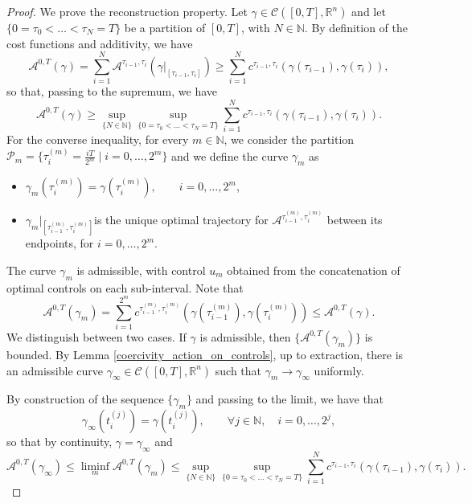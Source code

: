\documentclass[reqno]{amsart}
\theoremstyle{plain}
\theoremstyle{definition}
\theoremstyle{remark}
\newcommand{\R}{\mathbb{R}}
\begin{document}
\begin{proof}
		We prove the reconstruction property. Let $\gamma\in\mathcal{C}([0,T],\mathbb{R}^n)$ and let $\{0=\tau_0<\ldots<\tau_N=T\}$ be a partition of $[0,T]$, with $N\in\mathbb{N}$. By definition of the cost functions and additivity, we have
		\begin{equation}
			\mathcal{A}^{0,T}(\gamma)=\sum_{i=1}^{N}\mathcal{A}^{\tau_{i-1},\tau_i}(\gamma|_{[\tau_{i-1},\tau_i]})\geq\sum_{i=1}^{N}c^{\tau_{i-1},\tau_i}\left(\gamma(\tau_{i-1}),\gamma(\tau_i)\right),
		\end{equation}
		so that, passing to the supremum, we have 
		\begin{equation}
			\mathcal{A}^{0,T}(\gamma)\geq\sup\limits_{\{N\in\mathbb{N}\}}\sup\limits_{\{0=\tau_0<\dots<\tau_N=T\}}\sum_{i=1}^{N}c^{\tau_{i-1},\tau_i}\left(\gamma(\tau_{i-1}),\gamma(\tau_i)\right).
		\end{equation}
		For the converse inequality, for every $m\in\mathbb{N}$, we consider the partition $\mathcal{P}_m=\{\tau_i^{(m)}=\frac{iT}{2^m}\mid i=0,\dots,2^m\}$ and we define the curve $\gamma_m$ as
		\begin{itemize}
			\item $\gamma_m(\tau_i^{(m)})=\gamma(\tau_i^{(m)}),\qquad i=0,\dots, 2^m$,
			\item $\gamma_m|_{[\tau_{i-1}^{(m)},\tau_i^{(m)}]}$\quad is the unique optimal trajectory for $\mathcal{A}^{\tau_{i-1}^{(m)},\tau_i^{(m)}}$ between its endpoints, for $ i=0,\dots, 2^m$.
		\end{itemize}
		The curve $\gamma_m$ is admissible, with control $u_m$ obtained from the concatenation of optimal controls on each sub-interval. Note that
        \begin{equation}
			\mathcal{A}^{0,T}(\gamma_m)=\sum_{i=1}^{2^m}c^{\tau_{i-1}^{(m)},\tau_i^{(m)}}(\gamma(\tau_{i-1}^{(m)}),\gamma(\tau_i^{(m)}))\leq \mathcal{A}^{0,T}(\gamma).
		\end{equation}
        We distinguish between two cases. If $\gamma$ is admissible, then $\{\mathcal{A}^{0,T}(\gamma_m)\}$ is bounded. By Lemma \ref{coercivity_action_on_controls}, up to extraction, there is an admissible curve $\gamma_\infty \in \mathcal{C}([0,T],\R^n)$ such that $\gamma_m \to \gamma_\infty$ uniformly.

		By construction of the sequence $\{\gamma_m\}$ and passing to the limit, we have that 
		\begin{equation}
			\gamma_{\infty}(t_i^{(j)})=\gamma(t_i^{(j)}),\qquad\forall j\in\mathbb{N},\quad i=0,\dots,2^j,
		\end{equation}
		so that by continuity, $\gamma=\gamma_{\infty}$ and 
		\begin{equation}
			\mathcal{A}^{0,T}(\gamma_{\infty})\leq\liminf\limits_{m}\mathcal{A}^{0,T}(\gamma_m)\leq\sup\limits_{\{N\in\mathbb{N}\}}\sup\limits_{\{0=\tau_0<\dots<\tau_N=T\}}\sum_{i=1}^{N}c^{\tau_{i-1},\tau_i}\left(\gamma(\tau_{i-1}),\gamma(\tau_i)\right).
		\end{equation}
        

\end{proof}
\end{document}
